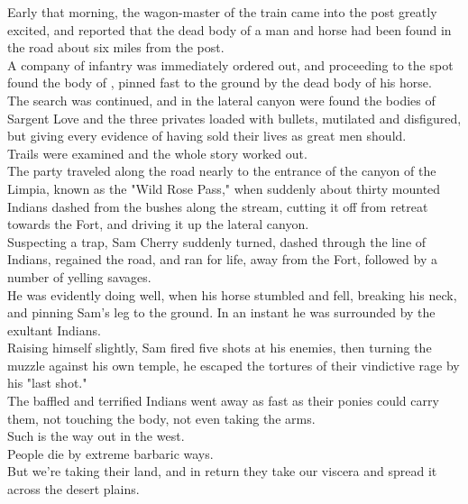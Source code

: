 

Early that morning, the wagon-master of the train came into the post greatly excited, and reported that the dead body of a man and horse had been found in the road about six miles from the post. \\

A company of infantry was immediately ordered out, and proceeding to the spot found the body of , pinned fast to the ground by the dead body of his horse. \\

The search was continued, and in the lateral canyon were found the bodies of Sargent Love and the three privates loaded with bullets, mutilated and disfigured, but giving every evidence of having sold their lives as great men should. \\

Trails were examined and the whole story worked out. \\

The party traveled along the road nearly to the entrance of the canyon of the Limpia, known as the "Wild Rose Pass," when suddenly about thirty mounted Indians dashed from the bushes along the stream, cutting it off from retreat towards the Fort, and driving it up the lateral canyon. \\

Suspecting a trap, Sam Cherry suddenly turned, dashed through the line of Indians, regained the road, and ran for life, away from the Fort, followed by a number of yelling savages. \\
He was evidently doing well, when his horse stumbled and fell, breaking his neck, and pinning Sam's leg to the ground. In an instant he was surrounded by the exultant Indians. \\

Raising himself slightly, Sam fired five shots at his enemies, then turning the muzzle against his own temple, he escaped the tortures of their vindictive rage by his "last shot." \\
The baffled and terrified Indians went away as fast as their ponies could carry them, not touching the body, not even taking the arms. \\

Such is the way out in the west. \\
People die by extreme barbaric ways. \\
But we're taking their land, and in return they take our viscera and spread it across the desert plains. \\

